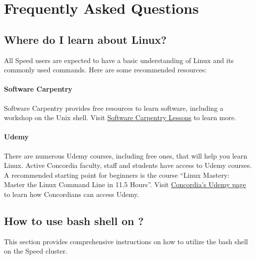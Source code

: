 \section{Frequently Asked Questions}
\label{sect:faqs}

\subsection{Where do I learn about Linux?}
\label{sect:faqs-linux}

All Speed users are expected to have a basic understanding of Linux and its commonly used commands.
Here are some recommended resources:

\paragraph*{Software Carpentry}
Software Carpentry provides free resources to learn software, including a workshop on the Unix shell.
Visit \href{https://software-carpentry.org/lessons/}{Software Carpentry Lessons} to learn more.

\paragraph*{Udemy}
There are numerous Udemy courses, including free ones, that will help you learn Linux. 
Active Concordia faculty, staff and students have access to Udemy courses. 
A recommended starting point for beginners is the course ``Linux Mastery: Master the Linux Command Line in 11.5 Hours''.
Visit \href{https://www.concordia.ca/it/services/udemy.html}{Concordia's Udemy page} to learn how Concordians can access Udemy.

\subsection{How to use bash shell on ?}
\label{sect:faqs-bash}

This section provides comprehensive instructions on how to utilize the bash shell on the Speed cluster.

